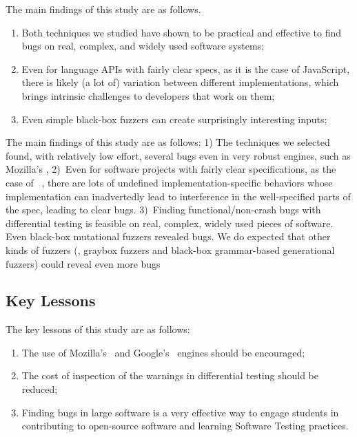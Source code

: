 \documentclass[smallextended]{svjour3}
\begin{document}
The main findings of this study are as follows.

\begin{enumerate}
  \item Both techniques we studied have shown to be practical and
    effective to find bugs on real, complex, and widely used software
    systems;
  \item Even for language APIs with fairly clear specs, as it is the
    case of JavaScript, there is likely (a lot of) variation between
    different implementations, which brings intrinsic challenges to
    developers that work on them;
  \item Even simple black-box fuzzers can create surprisingly
    interesting inputs;

\end{enumerate}


The main findings of this study are as follows: 1) The techniques we
selected found, with relatively low effort, several bugs even in very
robust engines, such as Mozilla's \smonkey, 2)~Even for software
projects with fairly clear specifications, as the case of
\javascript{}~\cite{ecmas262-spec}, there are lots of undefined
implementation-specific behaviors whose implementation can
inadvertedly lead to interference in the well-specified parts of the
spec, leading to clear bugs. 3)~Finding functional/non-crash bugs with
differential testing is feasible on real, complex, widely used pieces
of software. Even black-box mutational fuzzers revealed bugs. We do
expected that other kinds of fuzzers (\eg{}, graybox fuzzers and
black-box grammar-based generational fuzzers) could reveal even more
bugs

\subsection{Key Lessons}
\label{sec:lessons}

The key lessons of this study are as follows:

\begin{enumerate}
\item The use of Mozilla's \smonkey\ and Google's \veight\ engines
  should be encouraged;
\item The cost of inspection of the warnings in differential testing
  should be reduced;
\item Finding bugs in large software is a very effective way to engage
  students in contributing to open-source software and learning
  Software Testing practices.
\end{enumerate}
\end{document}

